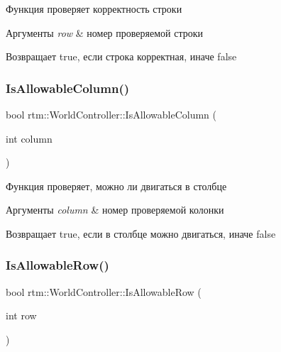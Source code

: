 Функция проверяет корректность строки 
\begin{DoxyParams}{Аргументы}
{\em row} & номер проверяемой строки \\
\hline
\end{DoxyParams}
\begin{DoxyReturn}{Возвращает}
true, если строка корректная, иначе false 
\end{DoxyReturn}
\mbox{\label{classrtm_1_1_world_controller_aae96f9a5d1a32b4c347fa07a6180f8fd}} 
\subsubsection{\texorpdfstring{Is\+Allowable\+Column()}{IsAllowableColumn()}}
{\footnotesize\ttfamily bool rtm\+::\+World\+Controller\+::\+Is\+Allowable\+Column (\begin{DoxyParamCaption}\item[{int}]{column }\end{DoxyParamCaption})}

Функция проверяет, можно ли двигаться в столбце 
\begin{DoxyParams}{Аргументы}
{\em column} & номер проверяемой колонки \\
\hline
\end{DoxyParams}
\begin{DoxyReturn}{Возвращает}
true, если в столбце можно двигаться, иначе false 
\end{DoxyReturn}
\mbox{\label{classrtm_1_1_world_controller_a0adbbeed573fe3d987c6db2f14e50d21}} 
\subsubsection{\texorpdfstring{Is\+Allowable\+Row()}{IsAllowableRow()}}
{\footnotesize\ttfamily bool rtm\+::\+World\+Controller\+::\+Is\+Allowable\+Row (\begin{DoxyParamCaption}\item[{int}]{row }\end{DoxyParamCaption})}

